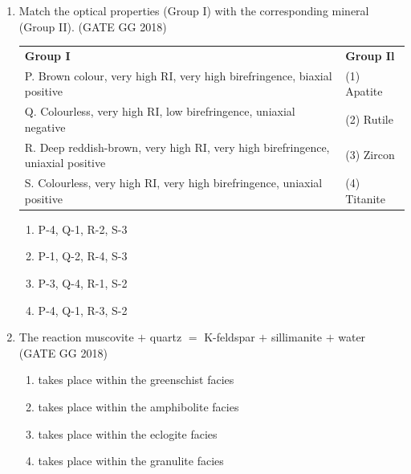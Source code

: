 \documentclass[journal]{IEEEtran}
\begin{document}
\begin{enumerate}[start=1]
\item Match the optical properties (Group I) with the corresponding mineral (Group II).  
\hfill(GATE GG 2018)\\
\begin{tabular}{ l l }
\textbf{Group I} & \textbf{Group Il}\\
P. Brown colour, very high RI, very high birefringence, biaxial positive & (1) Apatite\\
Q. Colourless, very high RI, low birefringence, uniaxial negative & (2) Rutile\\
R. Deep reddish-brown, very high RI, very high birefringence, uniaxial positive & (3) Zircon\\
S. Colourless, very high RI, very high birefringence, uniaxial positive & (4) Titanite  
\end{tabular}
\begin{multicols}{2}
\begin{enumerate}
\item P-4, Q-1, R-2, S-3
\item P-1, Q-2, R-4, S-3
\item P-3, Q-4, R-1, S-2
\item P-4, Q-1, R-3, S-2
\end{enumerate}
\end{multicols}

\item The reaction  
muscovite $+$ quartz $=$ K-feldspar $+$ sillimanite $+$ water  
\hfill(GATE GG 2018)
\begin{multicols}{2}
\begin{enumerate}
\item takes place within the greenschist facies
\item takes place within the amphibolite facies
\item takes place within the eclogite facies
\item takes place within the granulite facies
\end{enumerate}
\end{multicols}


\end{enumerate}
\end{document}
